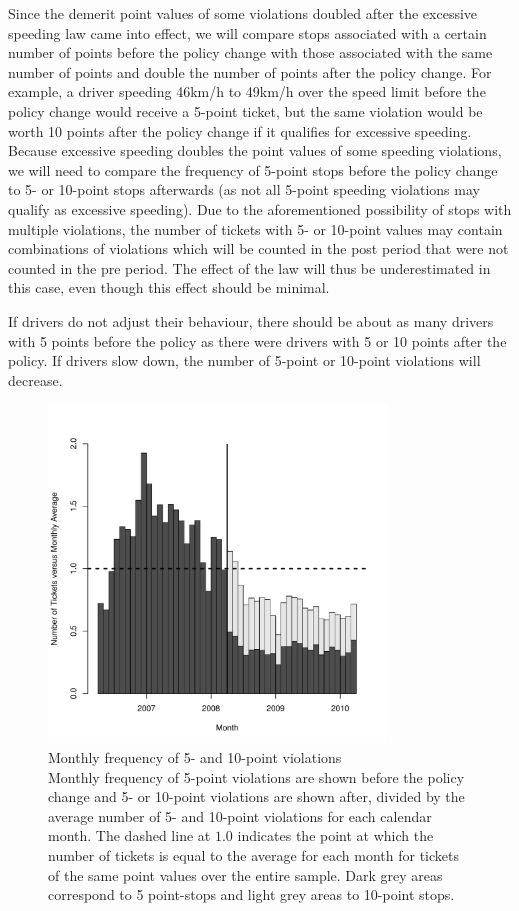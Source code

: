 \documentclass{cje}
\begin{document}
Since the demerit point values of some violations doubled 
after the excessive speeding law came into effect, 
% 
we will compare stops associated with a certain number of points 
before the policy change with those associated with the 
same number of points and double the number of points after the policy change. 
For example, a driver speeding 46km/h to 49km/h over the speed limit 
before the policy change would receive a 5-point ticket, 
but the same violation would be worth 10 points after the policy change 
if it qualifies for excessive speeding. 
Because excessive speeding doubles the point values of some speeding violations, 
we will need to compare the frequency of 5-point stops before the policy change 
to 5- or 10-point stops afterwards 
(as not all 5-point speeding violations may qualify as excessive speeding). 
Due to the aforementioned possibility of stops with multiple violations, 
the number of tickets with 5- or 10-point values may contain 
combinations of violations which will be counted in the post period 
that were not counted in the pre period. The effect of the law 
will thus be underestimated in this case, even though this effect should be minimal.

If drivers do not adjust their behaviour, 
there should be about as many drivers with 5 points before the policy 
as there were drivers with 5 or 10 points after the policy. 
If drivers slow down, the number of 5-point or 10-point violations will decrease. 


\begin{figure}
\centering
\includegraphics[width=0.8\textwidth]{Figure1}
\caption{Monthly frequency of 5- and 10-point violations \\
Monthly frequency of 5-point violations are shown before the policy change 
and 5- or 10-point violations are shown after, 
divided by the average number of 5- and 10-point violations
for each calendar month. 
% 
The dashed line at $1.0$ indicates the point at which 
the number of tickets is equal to the average for each month 
for tickets of the same point values over the entire sample.
% 
Dark grey areas correspond to 5 point-stops and light grey areas to 10-point stops.
}\label{fig:num_pts_5_10_all}
\end{figure}
\end{document}
